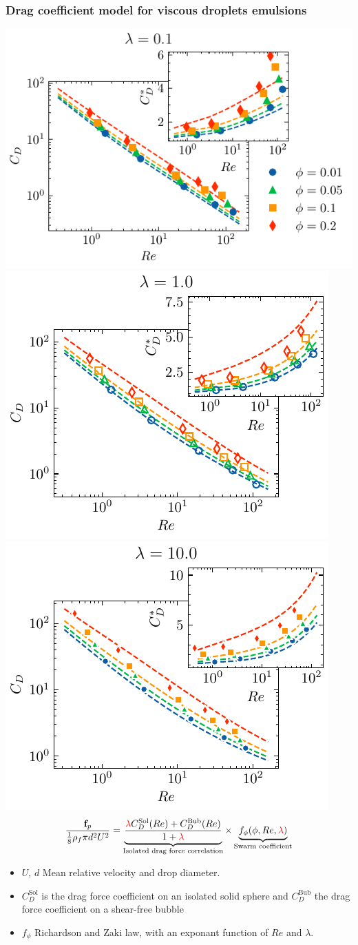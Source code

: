 \documentclass{sintefbeamer}
\begin{document}
\begin{frame}
  \frametitle{Drag coefficient model for viscous droplets emulsions}
    \centering    
    \includegraphics[height = 0.23\textwidth]{image/HOMOGENEOUS_final/CA/Cp_l_0.pdf}
    \includegraphics[height = 0.23\textwidth]{image/HOMOGENEOUS_final/CA/Cp_l_1.pdf}
    \includegraphics[height = 0.23\textwidth]{image/HOMOGENEOUS_final/CA/Cp_l_10.pdf}
\begin{equation*}
  \frac{\textbf{f}_p}{\frac{1}{8}\rho_f \pi d^2 U^2}
  = 
  \underbrace{
    \frac{  \textcolor{red}{\lambda}   C_D^\text{Sol}(Re)+ C_D^\text{Bub}(Re)}
    {1+\textcolor{red}{\lambda}} 
    }_\text{Isolated drag force correlation}
    \times
  \underbrace{f_\phi(\phi, Re,\textcolor{red}{\lambda})}_\text{Swarm coefficient}
\end{equation*}
\begin{itemize}
  \item $U$, $d$ Mean relative velocity and drop diameter. 
  \item $C_D^\text{Sol}$ is the drag force coefficient on an isolated solid sphere and $C_D^\text{Bub}$ the drag force coefficient on a shear-free bubble
  \item $f_\phi$ Richardson and Zaki law, with an exponant function of $Re$ and $\lambda$. 
\end{itemize}

\end{frame}
\end{document}
